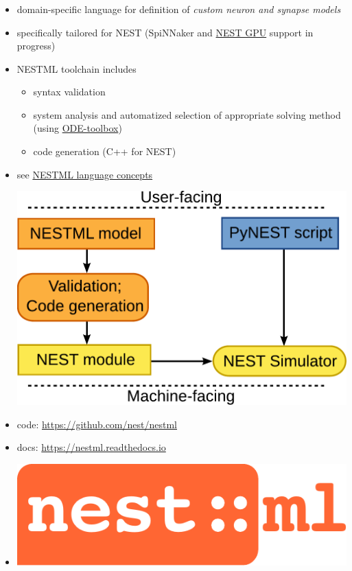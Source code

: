 \documentclass[8pt,t,usepdftitle=false]{beamer}
\begin{document}
\begin{frame}[t,plain]
  \frametitle{\ttl}
  \begin{itemize}
  \item domain-specific language for definition of \emph{custom neuron and synapse models}
  \item specifically tailored for NEST (SpiNNaker and \href{https://nest-gpu.readthedocs.io}{NEST GPU} support in progress)
  \item NESTML toolchain includes
    \begin{itemize}
    \item syntax validation
    \item system analysis and automatized selection of appropriate solving method (using \href{https://ode-toolbox.readthedocs.io}{ODE-toolbox})
    \item code generation (C++ for NEST)
    \end{itemize}
  \item see \href{https://nestml.readthedocs.io/en/latest/nestml_language/nestml_language_concepts.html}{NESTML language concepts}\\[2ex]
    \begin{center}      
      \includegraphics[width=0.5\linewidth]{./figures/nestml-workflow.pdf}
    \end{center}
    \vspace*{2ex}
  \item code: \url{https://github.com/nest/nestml}
  \item docs: \url{https://nestml.readthedocs.io}
  \item[] \vspace*{-5ex}\hfill\includegraphics[width=0.2\linewidth]{./figures/nestml-logo.pdf}
  \end{itemize}
\end{frame}
\end{document}
